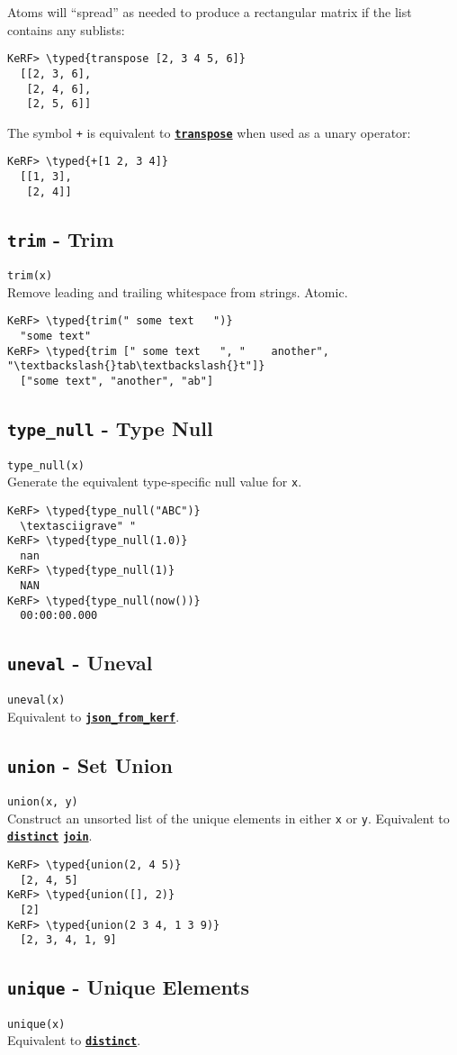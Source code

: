 \documentclass{article}
\newcommand{\typed}[1]{\textcolor{TealBlue}{#1}}
\newcommand{\primdefu}[3]{\subsection{\texttt{#1} - #2}\label{prim:#3}}
\newcommand{\primu}[2]{\hyperref[prim:#2]{\textbf{\texttt{#1}}}}
\newcommand{\primdef}[2]{\primdefu{#1}{#2}{#1}}
\newcommand{\prim}[1]{\primu{#1}{#1}}
\begin{document}
Atoms will ``spread'' as needed to produce a rectangular matrix if the list contains any sublists:
\begin{Verbatim}
KeRF> \typed{transpose [2, 3 4 5, 6]}
  [[2, 3, 6], 
   [2, 4, 6], 
   [2, 5, 6]]
\end{Verbatim}

The symbol \texttt{+} is equivalent to \prim{transpose} when used as a unary operator:
\begin{Verbatim}
KeRF> \typed{+[1 2, 3 4]}
  [[1, 3],
   [2, 4]]
\end{Verbatim}

\primdef{trim}{Trim}
\texttt{trim(x)}\\

Remove leading and trailing whitespace from strings. Atomic.
\begin{Verbatim}
KeRF> \typed{trim(" some text   ")}
  "some text"
KeRF> \typed{trim [" some text   ", "    another", "\textbackslash{}tab\textbackslash{}t"]}
  ["some text", "another", "ab"]
\end{Verbatim}

\primdefu{type\_null}{Type Null}{typeNull}
\texttt{type\_null(x)}\\

Generate the equivalent type-specific null value for \texttt{x}.
\begin{Verbatim}
KeRF> \typed{type_null("ABC")}
  \textasciigrave" "
KeRF> \typed{type_null(1.0)}
  nan
KeRF> \typed{type_null(1)}
  NAN
KeRF> \typed{type_null(now())}
  00:00:00.000
\end{Verbatim}

\primdef{uneval}{Uneval}
\texttt{uneval(x)}\\

Equivalent to \primu{json\_from\_kerf}{jsonFromKerf}.

\primdef{union}{Set Union}
\texttt{union(x, y)}\\

Construct an unsorted list of the unique elements in either \texttt{x} or \texttt{y}. Equivalent to \prim{distinct} \prim{join}.
\begin{Verbatim}
KeRF> \typed{union(2, 4 5)}
  [2, 4, 5]
KeRF> \typed{union([], 2)}
  [2]
KeRF> \typed{union(2 3 4, 1 3 9)}
  [2, 3, 4, 1, 9]
\end{Verbatim}

\primdef{unique}{Unique Elements}
\texttt{unique(x)}\\

Equivalent to \prim{distinct}.
\end{document}
